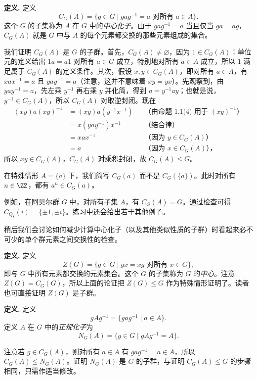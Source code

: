 \noindent\textbf{定义.} 定义
\[
  C_G(A)=\{g\in G\mid gag^{-1}=a\text{ 对所有 }a\in A\}.
\]
这个 $G$ 的子集称为 $A$ 在 $G$ 中的\emph{中心化子}。由于 $gag^{-1}=a$ 当且仅当 $ga=ag$，$C_G(A)$ 就是 $G$ 中与 $A$ 的每个元素都交换的那些元素组成的集合。

我们证明 $C_G(A)$ 是 $G$ 的子群。首先，$C_G(A)\neq\varnothing$，因为 $1\in C_G(A)$：单位元的定义给出 $1a=a1$ 对所有 $a\in G$ 成立，特别地对所有 $a\in A$ 成立，所以 $1$ 满足属于 $C_G(A)$ 的定义条件。其次，假设 $x,y\in C_G(A)$，即对所有 $a\in A$，有 $xax^{-1}=a$ 且 $yay^{-1}=a$（注意，这并不意味着 $xy=yx$）。先观察到，由 $yay^{-1}=a$，先左乘 $y^{-1}$ 再右乘 $y$ 并化简，得到 $a=y^{-1}ay$；也就是说，$y^{-1}\in C_G(A)$，所以 $C_G(A)$ 对取逆封闭。现在
\begin{align*}
  (xy)a(xy)^{-1}
  &= (xy)a(y^{-1}x^{-1}) &&\text{（由命题 1.1(4) 用于 $(xy)^{-1}$）}\\
  &= x(yay^{-1})x^{-1} &&\text{（结合律）}\\
  &= xax^{-1} &&\text{（因为 $y\in C_G(A)$）}\\
  &= a &&\text{（因为 $x\in C_G(A)$），}
\end{align*}
所以 $xy\in C_G(A)$，$C_G(A)$ 对乘积封闭，故 $C_G(A)\leq G$。

在特殊情形 $A=\{a\}$ 下，我们简写 $C_G(a)$ 而不是 $C_G(\{a\})$。此时对所有 $n\in\ZZ$，都有 $a^n\in C_G(a)$。

例如，在阿贝尔群 $G$ 中，对所有子集 $A$，有 $C_G(A)=G$。通过检查可得 $C_{Q_8}(i)=\{\pm1,\pm i\}$。练习中还会给出若干其他例子。

稍后我们会讨论如何减少计算中心化子（以及其他类似性质的子群）时看起来必不可少的单个群元素之间交换性的检查。

\noindent\textbf{定义.} 定义
\[
  Z(G)=\{g\in G\mid gx=xg\text{ 对所有 }x\in G\},
\]
即与 $G$ 中所有元素都交换的元素集合。这个 $G$ 的子集称为 $G$ 的\emph{中心}。注意 $Z(G)=C_G(G)$，所以上面的论证把 $Z(G)\leq G$ 作为特殊情形证明了。读者也可直接证明 $Z(G)$ 是子群。

\noindent\textbf{定义.} 定义
\[
  gAg^{-1}=\{gag^{-1}\mid a\in A\}.
\]
定义 $A$ 在 $G$ 中的\emph{正规化子}为
\[
  N_G(A)=\{g\in G\mid gAg^{-1}=A\}.
\]

注意若 $g\in C_G(A)$，则对所有 $a\in A$ 有 $gag^{-1}=a\in A$，所以 $C_G(A)\leq N_G(A)$。证明 $N_G(A)$ 是 $G$ 的子群，与证明 $C_G(A)\leq G$ 的步骤相同，只需作适当修改。

